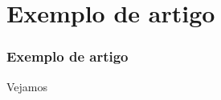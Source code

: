 \section{Exemplo de artigo}

\begin{frame}
  \frametitle{Exemplo de artigo}
  \Huge
  Vejamos 
\end{frame}
